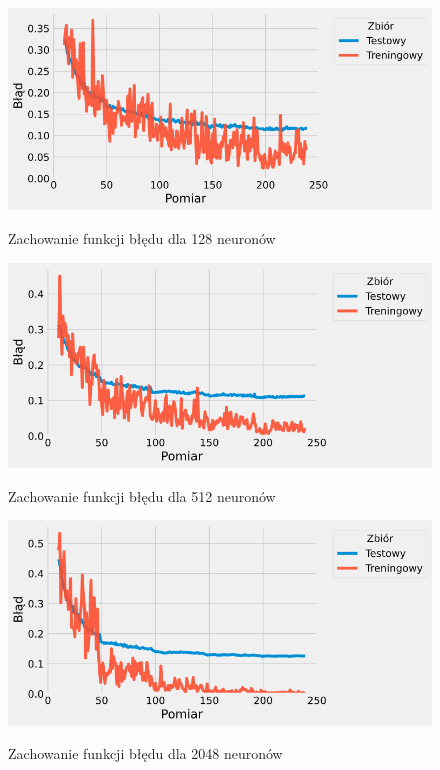 \documentclass{article}
\begin{document}
\begin{figure}[H]
	\centering
	\caption{Zachowanie funkcji błędu dla 128 neuronów}
	\includegraphics[width=\textwidth]{hidden_err_128.png}
	\label{fig:res14}
\end{figure}
\begin{figure}[H]
	\centering
	\caption{Zachowanie funkcji błędu dla 512 neuronów}
	\includegraphics[width=\textwidth]{hidden_err_512.png}
	\label{fig:res15}
\end{figure}
\begin{figure}[H]
	\centering
	\caption{Zachowanie funkcji błędu dla 2048 neuronów}
	\includegraphics[width=\textwidth]{hidden_err_2048.png}
	\label{fig:res11}
\end{figure}
\end{document}
